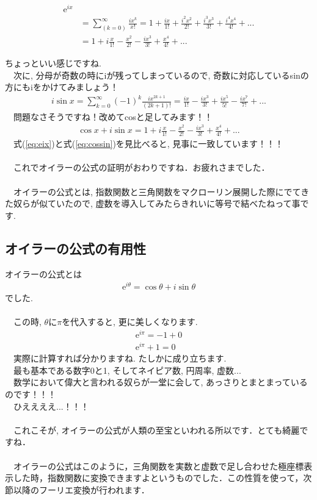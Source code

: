\documentclass[11pt,a4paper]{ujreport} 	%
\begin{document}
\begin{align}
\mathrm{e}^{ix} \\
& = \sum_{(k=0)}^\infty \frac{ix^k}{x!} = 1 + \frac{ix}{1!} + \frac{i^2x^2}{2!} + \frac{i^3x^3}{3!} + \frac{i^4x^4}{4!} + ...\\
& = 1 + i\frac{x}{1!} - \frac{x^2}{2!} - \frac{ix^3}{3!} + \frac{x^4}{4!} + ...
\label{eq:eix}
\end{align}

ちょっといい感じですね.\\
　次に, 分母が奇数の時にiが残ってしまっているので, 奇数に対応しているsinの方にもiをかけてみましょう！\\
\begin{eqnarray}
i\sin x = \sum_{k=0}^{\infty}(-1)^k \frac{ix^{2k + 1}}{(2k + 1)!} = \frac{ix}{1!} - \frac{ix^3}{3!} + \frac{ix^5}{5!} - \frac{ix^7}{7!} +  ...
\end{eqnarray}
　問題なさそうですね！改めてcosと足してみます！！\\
\begin{eqnarray}
\cos x + i\sin x = 1 + i\frac{x}{1!} - \frac{x^2}{2!} - \frac{ix^3}{3!} + \frac{x^4}{4!} + ...
\label{eq:cossin}
\end{eqnarray}
　式(\ref{eq:eix})と式(\ref{eq:cossin})を見比べると, 見事に一致しています！！！\\
\\
　これでオイラーの公式の証明がおわりですね．お疲れさまでした．\\
\\
　オイラーの公式とは, 指数関数と三角関数をマクローリン展開した際にでてきた奴らが似ていたので, 虚数を導入してみたらきれいに等号で結べたねって事です.\\

\subsection{オイラーの公式の有用性}
オイラーの公式とは
\begin{eqnarray}
\mathrm{e}^{i\theta} = \cos \theta + i\sin \theta
\end{eqnarray}
でした.\\
\\
　この時, $\theta$に$\pi$を代入すると, 更に美しくなります.
\\
\begin{eqnarray}
\mathrm{e}^{i\pi} = -1 + 0\\
\mathrm{e}^{i\pi} + 1 = 0
\end{eqnarray}
　実際に計算すれば分かりますね. たしかに成り立ちます. \\
　最も基本である数字0と1, そしてネイピア数, 円周率, 虚数...\\
　数学において偉大と言われる奴らが一堂に会して, あっさりとまとまっているのです！！！\\
　ひええええ...！！！\\
\\
　これこそが, オイラーの公式が人類の至宝といわれる所以です．とても綺麗ですね．\\
\\
　オイラーの公式はこのように，三角関数を実数と虚数で足し合わせた極座標表示した時，指数関数に変換できますよというものでした．この性質を使って，次節以降のフーリエ変換が行われます．
\end{document}
